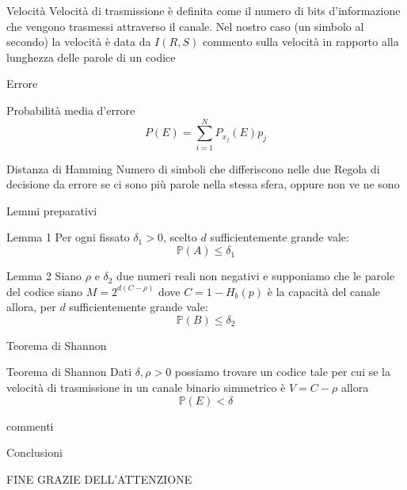 \documentclass{beamer}
\theoremstyle{definition}
\numberwithin{equation}{section}
\begin{document}
\begin{frame}[t]{Velocità} \vspace{5pt}
Velocità di trasmissione è definita come il numero di bits d'informazione che vengono trasmessi attraverso il canale. Nel nostro caso (un simbolo al secondo) la velocità è data da $I(R,S)$
commento sulla velocità in rapporto alla lunghezza delle parole di un codice
\end{frame}


\begin{frame}[t]{Errore} \vspace{5pt}
\begin{block}{Probabilità media d'errore}
$$P(E)=\sum_{i=1}^N P_{x_j}(E)p_j$$
\end{block}
\begin{block}{Distanza di Hamming}
\vspace{0.5em}
Numero di simboli che differiscono nelle due 
\vspace{0.5em}
Regola di decisione da errore se ci sono più parole nella stessa sfera, oppure non ve ne sono
\end{block}
\end{frame}


\begin{frame}[t]{Lemmi preparativi} \vspace{5pt}
\begin{block}{Lemma 1}
Per ogni fissato $\delta_1>0$, scelto $d$ sufficientemente grande vale:
$$\mathbb{P}(A)\leq \delta_1$$   
\end{block}

\begin{block}{Lemma 2}
Siano $\rho$ e $\delta_2$ due numeri reali non negativi e supponiamo che le parole del codice siano $M=2^{d(C-\rho)}$ dove $C=1-H_b(p)$ è la capacità del canale allora, per $d$ sufficientemente grande vale:
$$\mathbb{P}(B)\leq \delta_2$$
\end{block}
\end{frame}


\begin{frame}[t]{Teorema di Shannon} \vspace{5pt}
\begin{block}{Teorema di Shannon}
\vspace{0.5em}
Dati $\delta , \rho > 0$ possiamo trovare un codice tale per cui se la velocità di trasmissione in un canale binario simmetrico è $V=C-\rho$ allora
$$\mathbb{P}(E)< \delta$$
\vspace{0.5em}
\end{block}
commenti
\end{frame}


\begin{frame}[t]{Conclusioni} \vspace{5pt}

\end{frame}


\begin{frame}[t]{FINE} \vspace{5pt}
GRAZIE DELL'ATTENZIONE
\end{frame}
\end{document}
